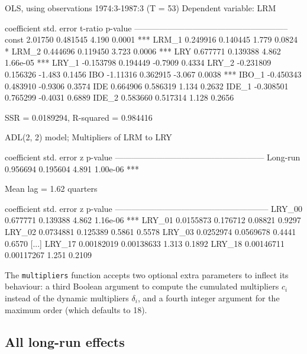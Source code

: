 \documentclass[a4paper,10pt]{article}
\begin{document}
\begin{scriptsize}
\begin{code}
OLS, using observations 1974:3-1987:3 (T = 53)
Dependent variable: LRM

             coefficient   std. error   t-ratio   p-value 
  --------------------------------------------------------
  const        2.01750      0.481545     4.190    0.0001   ***
  LRM_1        0.249916     0.140445     1.779    0.0824   *
  LRM_2        0.444696     0.119450     3.723    0.0006   ***
  LRY          0.677771     0.139388     4.862    1.66e-05 ***
  LRY_1       -0.153798     0.194449    -0.7909   0.4334  
  LRY_2       -0.231809     0.156326    -1.483    0.1456  
  IBO         -1.11316      0.362915    -3.067    0.0038   ***
  IBO_1       -0.450343     0.483910    -0.9306   0.3574  
  IDE          0.664906     0.586319     1.134    0.2632  
  IDE_1       -0.308501     0.765299    -0.4031   0.6889  
  IDE_2        0.583660     0.517314     1.128    0.2656  

SSR = 0.0189294, R-squared = 0.984416

ADL(2, 2) model;
Multipliers of LRM to LRY


             coefficient   std. error     z     p-value 
  ------------------------------------------------------
  Long-run    0.956694      0.195604    4.891   1.00e-06 ***

Mean lag =  1.62 quarters

             coefficient   std. error      z      p-value 
  --------------------------------------------------------
  LRY_00     0.677771      0.139388     4.862     1.16e-06 ***
  LRY_01     0.0155873     0.176712     0.08821   0.9297  
  LRY_02     0.0734881     0.125389     0.5861    0.5578  
  LRY_03     0.0252974     0.0569678    0.4441    0.6570
  [...]
  LRY_17     0.00182019    0.00138633   1.313     0.1892  
  LRY_18     0.00146711    0.00117267   1.251     0.2109  
\end{code}
\end{scriptsize}

The \texttt{multipliers} function accepts two optional extra
parameters to inflect its behaviour: a third Boolean argument to
compute the cumulated multipliers $c_i$ instead of the dynamic
multipliers $\delta_i$, and a fourth integer argument for the maximum
order (which defaults to 18).

\subsection{All long-run effects}
\label{sec:LR}
\end{document}
